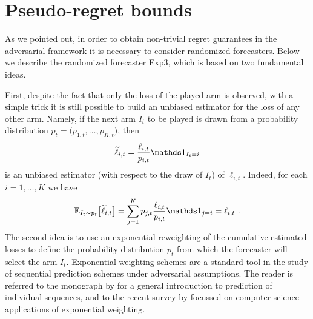 \section{Pseudo-regret bounds}
As we pointed out, in order to obtain non-trivial regret guarantees in the adversarial framework it is necessary to consider randomized forecasters. Below we describe the randomized forecaster Exp3, which is based on two fundamental ideas.
%
\begin{center}
\end{center}
%
First, despite the fact that only the loss of the played arm is observed, with a simple trick it is still possible to build an unbiased estimator for the loss of any other arm. Namely, if the next arm $I_t$ to be played is drawn from a probability distribution $p_t=\bigl(p_{1,t},\hdots,p_{K,t}\bigr)$, then
\[
    \tilde{\ell}_{i,t} = \frac{\ell_{i,t}}{p_{i,t}} \ds1_{I_t=i}
\]
is an unbiased estimator (with respect to the draw of $I_t$) of $\ell_{i,t}$. Indeed, for each $i=1,\dots,K$ we have
\[
    \E_{I_t \sim p_t} \bigl[\tilde{\ell}_{i,t}\bigr] = \sum_{j=1}^K  p_{j,t}\frac{\ell_{i,t}}{p_{i,t}} \ds1_{j=i}  = \ell_{i,t}~.
\]
The second idea is to use an exponential reweighting of the cumulative estimated losses to define the probability distribution $p_t$ from which the forecaster will select the arm $I_t$. Exponential weighting schemes are a standard tool in the study of sequential prediction schemes under adversarial assumptions. The reader is referred to the monograph by \cite{CL06} for a general introduction to prediction of individual sequences, and to the recent survey by \cite{arora2012multiplicative} focussed on computer science applications of exponential weighting.

